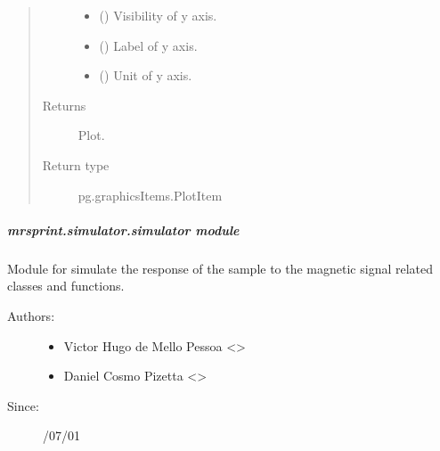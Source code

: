 \documentclass[a4paper,10pt,english]{sphinxmanual}
\begin{document}
\begin{fulllineitems}
\begin{quote}
\begin{description}
\begin{itemize}
\item {} 
 () \textendash{} Visibility of y axis.

\item {} 
 () \textendash{} Label of y axis.

\item {} 
 () \textendash{} Unit of y axis.

\end{itemize}

\item[{Returns}] \leavevmode
Plot.

\item[{Return type}] \leavevmode
pg.graphicsItems.PlotItem

\end{description}\end{quote}

\end{fulllineitems}



\subparagraph{mrsprint.simulator.simulator module}
\label{\detokenize{autodoc/mrsprint/mrsprint.simulator:module-mrsprint.simulator.simulator}}\label{\detokenize{autodoc/mrsprint/mrsprint.simulator:mrsprint-simulator-simulator-module}}
Module for simulate the response of the sample to the magnetic signal related classes and functions.
\begin{description}
\item[{Authors:}] \leavevmode\begin{itemize}
\item {} 
Victor Hugo de Mello Pessoa \textless{}\textgreater{}

\item {} 
Daniel Cosmo Pizetta \textless{}\textgreater{}

\end{itemize}

\item[{Since:}] /07/01

\end{description}
\end{document}
